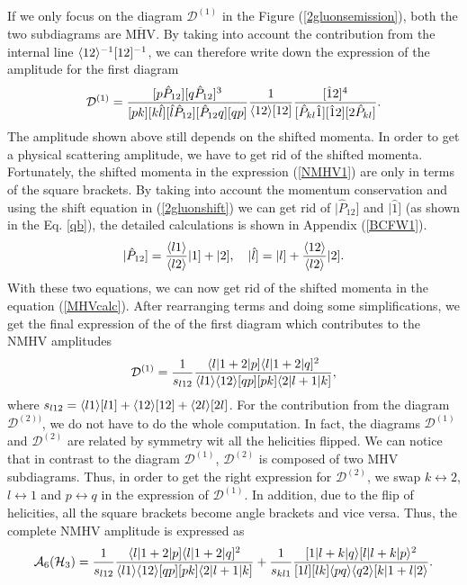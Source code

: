 If we only focus on the diagram $\mathcal{D}^{(1)}$ in the Figure (\ref{2gluonsemission}), both the two subdiagrams are $\overline{\text{MHV}}$. By taking into account the contribution from the internal line $\langle12\rangle^{-1}[12]^{-1}$, we can therefore write down the expression of the amplitude for the first diagram 
\begin{equation}
\mathcal{D}^{(1)}= \frac{[p\hat{P}_{12}][q\hat{P}_{12}]^3}{[pk] [k \hat{l}] [\hat{l} \hat{P}_{12}] [\hat{P}_{12} q] [qp]} \frac{1}{\langle12\rangle [12]} \frac{[\hat{1}2]^4}{[\hat{P}_{kl} \hat{1}] [\hat{1}2] [2\hat{P}_{kl}]}.
\label{NMHV1}
\end{equation}
The amplitude shown above still depends on the shifted momenta. In order to get a physical scattering amplitude, we have to get rid of the shifted momenta. Fortunately, the shifted momenta in the expression (\ref{NMHV1}) are only in terms of the square brackets. By taking into account the momentum conservation and using the shift equation in (\ref{2gluonshift}) we can get rid of $\vert \hat{P}_{12}]$ and $\vert \hat{1}]$ (as shown in the Eq. \ref{qb}), the detailed calculations is shown in Appendix (\ref{BCFW1}).
\begin{equation}
\vert \hat{P}_{12}] =\frac{\langle l1\rangle}{\langle l2\rangle} \vert 1]+\vert 2], \quad \vert \hat{l}]=\vert l]+\frac{\langle12\rangle}{\langle l2\rangle} \vert 2].
\label{qb}
\end{equation}
With these two equations, we can now get rid of the shifted momenta in the equation (\ref{MHVcalc}). After rearranging terms and doing some simplifications, we get the final expression of the of the first diagram which contributes to the NMHV amplitudes
\begin{equation}
\mathcal{D}^{(1)}=\frac{1}{s_{l12}} \frac{\langle l\vert 1+2\vert p] \langle l\vert 1+2\vert q]^2}{\langle l1\rangle \langle12\rangle [qp] [pk] \langle 2\vert l+1\vert k]},
\end{equation}
where $s_{l12}=\langle l1\rangle[l1]+\langle12\rangle[12]+\langle2l\rangle[2l]$. For the contribution from the diagram $\mathcal{D}^{(2))}$, we do not have to do the whole computation. In fact, the diagrams $\mathcal{D}^{(1)}$ and $\mathcal{D}^{(2)}$ are related by symmetry wit all the helicities flipped. We can notice that in contrast to the diagram $\mathcal{D}^{(1)}$, $\mathcal{D}^{(2)}$ is composed of two MHV subdiagrams. Thus, in order to get the right expression for $\mathcal{D}^{(2)}$, we swap $k \leftrightarrow 2$, $l \leftrightarrow 1$ and $p \leftrightarrow q$ in the expression of $\mathcal{D}^{(1)}$. In addition, due to the flip of helicities, all the square brackets become angle brackets and vice versa. Thus, the complete NMHV amplitude is expressed as
\begin{equation}
\mathcal{A}_6(\mathcal{H}_3) = \frac{1}{s_{l12}} \frac{\langle l\vert 1+2\vert p] \langle l\vert 1+2\vert q]^2}{\langle l1\rangle \langle12\rangle [qp] [pk] \langle 2\vert l+1\vert k]}+ \frac{1}{s_{kl1}} \frac{[1\vert l+k\vert q\rangle [l\vert l+k\vert p\rangle^2}{[1l] [lk] \langle pq\rangle \langle q2\rangle [k\vert 1+l\vert 2\rangle}.
\end{equation}


